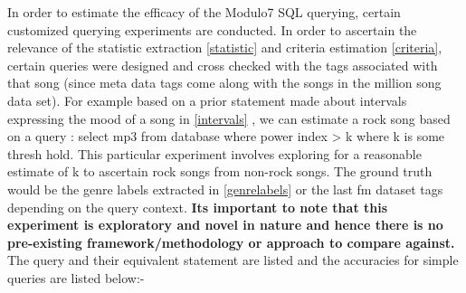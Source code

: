 \noindent In order to estimate the efficacy of the Modulo7 SQL querying, certain customized querying experiments are conducted. In order to ascertain the relevance of the statistic extraction \ref{statistic} and criteria estimation \ref{criteria}, certain queries were designed and cross checked with the tags associated with that song (since meta data tags come along with the songs in the million song data set). For example based on a prior statement made about intervals expressing the mood of a song in \ref{intervals} , we can estimate a rock song based on a query : select mp3 from database where power index > k where k is some thresh hold. This particular experiment involves exploring for a reasonable estimate of k to ascertain rock songs from non-rock songs. The ground truth would be the genre labels extracted in \ref{genrelabels} or the last fm dataset tags \cite{msd} depending on the query context. \textbf{Its important to note that this experiment is exploratory and novel in nature and hence there is no pre-existing framework/methodology or approach to compare against.}\\

\noindent The query and their equivalent statement are listed and the accuracies for simple queries are listed below:-


